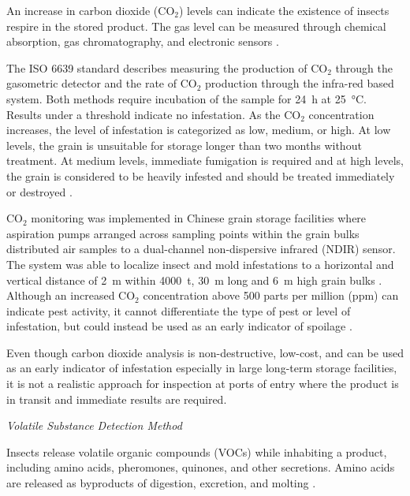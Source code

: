 \documentclass[../Vibro-Acoustic Signatures and Detection Algorithms for Stored Product Insects.tex]{subfiles}
\begin{document}
An increase in carbon dioxide ($\text{CO}_2$) levels can indicate the existence of insects respire in the stored product. The gas level can be measured through chemical absorption, gas chromatography, and electronic sensors \cite{zhangSitedirectedCO2Detection2014}.

The ISO 6639 standard describes measuring the production of $\text{CO}_2$ through the gasometric detector and the rate of $\text{CO}_2$ production through the infra-red based system. Both methods require incubation of the sample for \SI{24}{\hour} at \SI{25}{\degreeCelsius}. Results under a threshold indicate no infestation. As the $\text{CO}_2$ concentration increases, the level of infestation is categorized as low, medium, or high. At low levels, the grain is unsuitable for storage longer than two months without treatment. At medium levels, immediate fumigation is required and at high levels, the grain is considered to be heavily infested and should be treated immediately or destroyed \cite{ISO6639Cereals1986}.

$\text{CO}_2$ monitoring was implemented in Chinese grain storage facilities where aspiration pumps arranged across sampling points within the grain bulks distributed air samples to a dual-channel non-dispersive infrared (NDIR) sensor. The system was able to localize insect and mold infestations to a horizontal and vertical distance of \SI{2}{\meter} within \SI{4000}{\tonne}, \SI{30}{\meter} long and \SI{6}{\meter} high grain bulks \cite{zhangSitedirectedCO2Detection2014}. Although an increased $\text{CO}_2$ concentration above 500 parts per million (ppm) can indicate pest activity, it cannot differentiate the type of pest or level of infestation, but could instead be used as an early indicator of spoilage \cite{thiruppathiContinuousCarbonDioxide2024}.

Even though carbon dioxide analysis is non-destructive, low-cost, and can be used as an early indicator of infestation especially in large long-term storage facilities, it is not a realistic approach for inspection at ports of entry where the product is in transit and immediate results are required.

\newpage
\textit{Volatile Substance Detection Method}

Insects release volatile organic compounds (VOCs) while inhabiting a product, including amino acids, pheromones, quinones, and other secretions. Amino acids are released as byproducts of digestion, excretion, and molting \cite{rajeshEfficacyTnauStackProbe2015, srivastavaFuzzyControllerBased2019, srivastavaProbabilisticArtificialNeural2019}.
\end{document}
